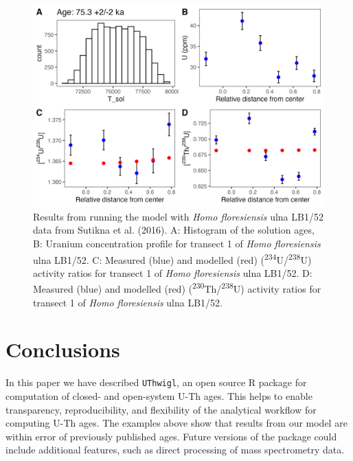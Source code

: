\documentclass[]{elsarticle} %
\begin{document}
\newpage



\begin{figure}
\includegraphics[width=0.95\linewidth]{figures/plot-panel-hobbit} \caption{Results from running the model with \emph{Homo floresiensis} ulna LB1/52 data from Sutikna et al. (2016). A: Histogram of the solution ages, B: Uranium concentration profile for transect 1 of \emph{Homo floresiensis} ulna LB1/52. C: Measured (blue) and modelled (red) (\textsuperscript{234}U/\textsuperscript{238}U) activity ratios for transect 1 of \emph{Homo floresiensis} ulna LB1/52. D: Measured (blue) and modelled (red) (\textsuperscript{230}Th/\textsuperscript{238}U) activity ratios for transect 1 of \emph{Homo floresiensis} ulna LB1/52.}\label{fig:plot-panel-hobbit-fig}
\end{figure}

\FloatBarrier

\hypertarget{conclusions}{%
\section{Conclusions}\label{conclusions}}

In this paper we have described \texttt{UThwigl}, an open source R package for computation of closed- and open-system U-Th ages. This helps to enable transparency, reproducibility, and flexibility of the analytical workflow for computing U-Th ages. The examples above show that results from our model are within error of previously published ages.
Future versions of the package could include additional features, such as direct processing of mass spectrometry data.

\newpage
\end{document}
